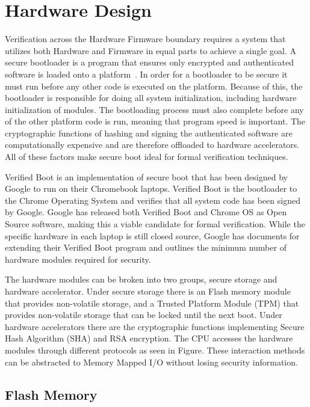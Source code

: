 \documentclass[../report.tex]{subfiles}
\begin{document}
\onehalfspacing

\section{Hardware Design}

Verification across the Hardware Firmware boundary requires a system that utilizes both Hardware and Firmware in equal parts to achieve a single goal.
A secure bootloader is a program that ensures only encrypted and authenticated software is loaded onto a platform~\cite{secure-bootloader}.
In order for a bootloader to be secure it must run before any other code is executed on the platform.
Because of this, the bootloader is responsible for doing all system initialization, including hardware initialization of modules.
The bootloading process must also complete before any of the other platform code is run, meaning that program speed is important. 
The cryptographic functions of hashing and signing the authenticated software are computationally expensive and are therefore offloaded to hardware accelerators. 
All of these factors make secure boot ideal for formal verification techniques.

Verified Boot is an implementation of secure boot that has been designed by Google to run on their Chromebook laptops.
Verified Boot is the bootloader to the Chrome Operating System and verifies that all system code has been signed by Google.
Google has released both Verified Boot and Chrome OS as Open Source software, making this a viable candidate for formal verification.
While the specific hardware in each laptop is still closed source, Google has documents for extending their Verified Boot program and outlines the minimum
number of hardware modules required for security.

The hardware modules can be broken into two groups, secure storage and hardware accelerator.
Under secure storage there is an Flash memory module that provides non-volatile storage, and a Trusted Platform Module (TPM) that provides non-volatile storage that can be locked until the next boot.
Under hardware accelerators there are the cryptographic functions implementing Secure Hash Algorithm (SHA) and RSA encryption. 
The CPU accesses the hardware modules through different protocols as seen in Figure. %
These interaction methods can be abstracted to Memory Mapped I/O without losing security information.

\subsection{Flash Memory}\label{flash_mem}
\end{document}

